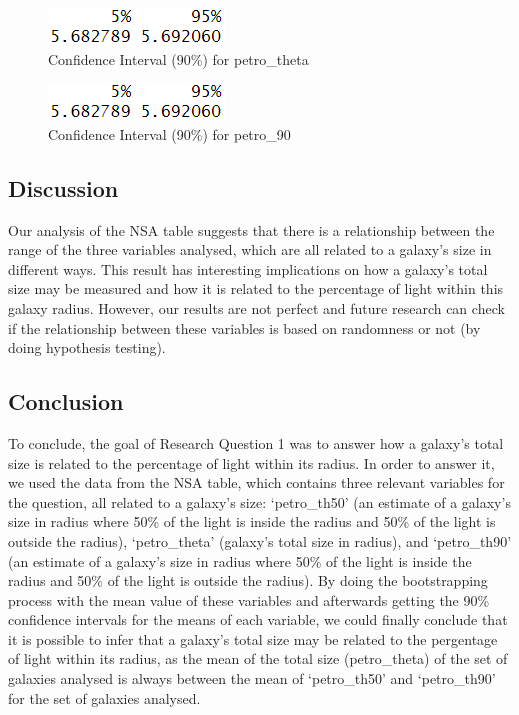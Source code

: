 \documentclass[12pt]{article}
\begin{document}
\begin{figure}[!h]
	\centering
	\includegraphics{pic/the_t.png}
	\caption{Confidence Interval (90\%) for petro\_theta}
\end{figure}

\begin{figure}[!h]
	\centering
	\includegraphics{pic/the_t.png}
	\caption{Confidence Interval (90\%) for petro\_90}
\end{figure}

\newpage
\subsection{Discussion}
Our analysis of the NSA table suggests that there is a relationship between the range of the three variables analysed, which are all related to a galaxy's size in different ways. This result has interesting implications on how a galaxy's total size may be measured and how it is related to the percentage of light within this galaxy radius. However, our results are not perfect and future research can check if the relationship between these variables is based on randomness or not (by doing hypothesis testing).


\subsection{Conclusion}
To conclude, the goal of Research Question 1 was to answer how a galaxy's total size is related to the percentage of light within its radius. In order to answer it, we used the data from the NSA table, which contains three relevant variables for the question, all related to a galaxy's size: `petro\_th50' (an estimate of a galaxy's size in radius where 50\% of the light is inside the radius and 50\% of the light is outside the radius), `petro\_theta' (galaxy's total size in radius), and `petro\_th90' (an estimate of a galaxy's size in radius where 50\% of the light is inside the radius and 50\% of the light is outside the radius). By doing the bootstrapping process with the mean value of these variables and afterwards getting the 90\% confidence intervals for the means of each variable, we could finally conclude that it is possible to infer that a galaxy's total size may be related to the pergentage of light within its radius, as the mean of the total size (petro\_theta) of the set of galaxies analysed is always between the mean of `petro\_th50' and `petro\_th90' for the set of galaxies analysed. 
\end{document}
